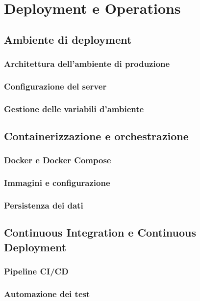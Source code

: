 \documentclass[12pt,a4paper,oneside]{report}
\begin{document}
\chapter{Deployment e Operations}
\section{Ambiente di deployment}
\subsection{Architettura dell'ambiente di produzione}

\subsection{Configurazione del server}

\subsection{Gestione delle variabili d'ambiente}

\section{Containerizzazione e orchestrazione}
\subsection{Docker e Docker Compose}

\subsection{Immagini e configurazione}

\subsection{Persistenza dei dati}

\section{Continuous Integration e Continuous Deployment}
\subsection{Pipeline CI/CD}

\subsection{Automazione dei test}
\end{document}

